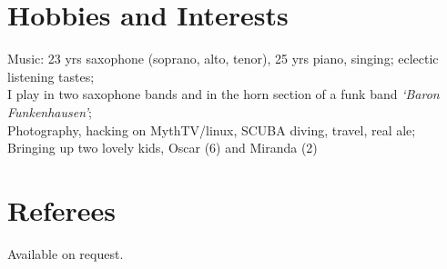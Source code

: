 \documentclass[margin,line]{resume}
\begin{document}
\begin{resume}
    \section{\mysidestyle Hobbies and Interests}

    Music: 23 yrs saxophone (soprano, alto, tenor), 25 yrs piano, singing; eclectic listening tastes;\vspace{0.5mm}\\%
    I play in two saxophone bands and in the horn section of a funk band \textsl{`Baron Funkenhausen'};\vspace{0.5mm}\\%
    Photography, hacking on MythTV/linux, SCUBA diving, travel, real ale;\vspace{0.5mm}\\%
    Bringing up two lovely kids, Oscar (6) and Miranda (2)


    \section{\mysidestyle Referees} 

    Available on request.


\end{resume}
\end{document}
